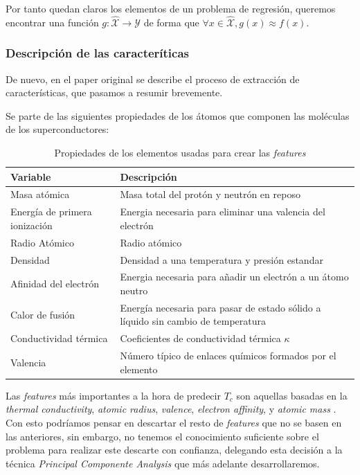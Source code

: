 \documentclass[11pt]{article}
\begin{document}
Por tanto quedan claros los elementos de un problema de regresión, queremos encontrar una función $g: \hat{\mathcal{X}} \rightarrow \mathcal{Y}$ de forma que $\forall x \in \hat{\mathcal{X}}, g(x) \approx f(x)$.

\subsubsection{Descripción de las caracteríticas} \label{descripcion_caracteristicas}

De nuevo, en el paper original \cite{original_paper_reg:paper} se describe el proceso de extracción de características, que pasamos a resumir brevemente.

Se parte de las siguientes propiedades de los átomos que componen las moléculas de los superconductores:

\begin{table}[H]
\begin{tabularx}{\textwidth}{|X|X|}
    \hline
    \textbf{Variable} & \textbf{Descripción} \\
    \hline
    Masa atómica & Masa total del protón y neutrón en reposo \\
    Energía de primera ionización & Energia necesaria para eliminar una valencia del electrón \\
    Radio Atómico & Radio atómico \\
    Densidad & Densidad a una temperatura y presión estandar \\
    Afinidad del electrón & Energia necesaria para añadir un electrón a un átomo neutro \\
    Calor de fusión & Energía necesaria para pasar de estado sólido a líquido sin cambio de temperatura \\
    Conductividad térmica &  Coeficientes de conductividad térmica $\kappa$ \\
    Valencia & Número típico de enlaces químicos formados por el elemento \\
    \hline
\end{tabularx}
\caption{Propiedades de los elementos usadas para crear las \emph{features} }
\end{table}

Las \emph{features} más importantes a la hora de predecir $T_c$ son aquellas basadas en la \emph{thermal conductivity}, \emph{atomic radius}, \emph{valence}, \emph{electron affinity}, y \emph{atomic mass} \cite{original_paper_reg:paper}. Con esto podríamos pensar en descartar el resto de \emph{features} que no se basen en las anteriores, sin embargo, no tenemos el conocimiento suficiente sobre el problema para realizar este descarte con confianza, delegando esta decisión a la técnica \emph{Principal Componente Analysis} que más adelante desarrollaremos.
\end{document}
